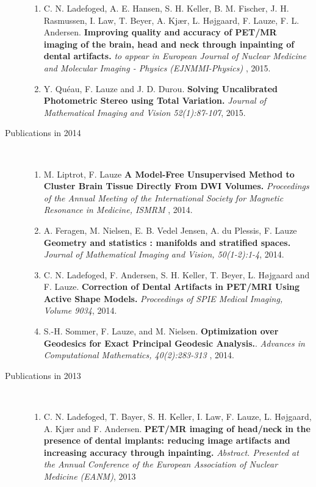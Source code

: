 \documentclass[10pt]{article}
\begin{document}
\begin{description}
\begin{enumerate}
  \item C. N. Ladefoged, A. E. Hansen, S. H. Keller, B. M. Fischer, J. H. Rasmussen,
    I. Law, T. Beyer, A. Kj{\ae}r, L. H{\o}jgaard, F. Lauze, F. L. Andersen.  \textbf{
      Improving quality and accuracy of PET/MR imaging of the brain, head and neck through
      inpainting of dental artifacts.  } \textit{ to appear in European Journal of Nuclear
      Medicine and Molecular Imaging - Physics (EJNMMI-Physics) }, 2015.

  \item Y. Qu{\'e}au, F. Lauze and J. D. Durou.  \textbf{ Solving Uncalibrated Photometric
      Stereo using Total Variation.  } \textit{ Journal of Mathematical Imaging and Vision
      52(1):87-107}, 2015.
  \end{enumerate}


\item[Publications in 2014]~\\

  \begin{enumerate}
  \item M. Liptrot, F. Lauze \textbf{ A Model-Free Unsupervised Method to Cluster Brain
      Tissue Directly From DWI Volumes.  } \textit{ Proceedings of the Annual Meeting of
      the International Society for Magnetic Resonance in Medicine, ISMRM }, 2014.

  \item A. Feragen, M. Nielsen, E. B. Vedel Jensen, A. du Plessis, F. Lauze \textbf{
      Geometry and statistics : manifolds and stratified spaces.  } \textit{ Journal of
      Mathematical Imaging and Vision, 50(1-2):1-4}, 2014.

  \item C. N. Ladefoged, F. Andersen, S. H. Keller, T. Beyer, L. H{\o}jgaard and F. Lauze.
    \textbf{ Correction of Dental Artifacts in PET/MRI Using Active Shape Models.  }
    \textit{ Proceedings of SPIE Medical Imaging, Volume 9034}, 2014.

  \item S.-H. Sommer, F. Lauze, and M. Nielsen.
    \textbf{Optimization over Geodesics for Exact Principal Geodesic Analysis.}.  \textit{
      Advances in Computational Mathematics, 40(2):283-313 }, 2014. 
  \end{enumerate}

\item[Publications in 2013]~\\
  
  \begin{enumerate}
  \item C. N. Ladefoged, T. Bayer, S. H. Keller, I. Law, F. Lauze, L. H{\o}jgaard,
    A. Kj{\ae}r and F. Andersen.  \textbf{ PET/MR imaging of head/neck in the presence of
      dental implants: reducing image artifacts and increasing accuracy through
      inpainting.  } \textit{ Abstract. Presented at the Annual Conference of the European
      Association of Nuclear Medicine (EANM)}, 2013


\end{enumerate}
\end{description}
\end{document}
